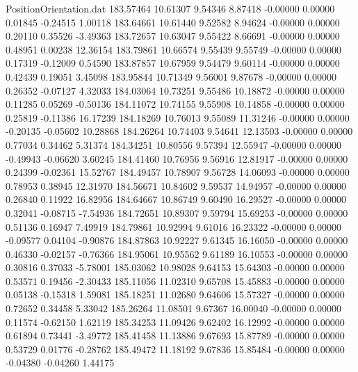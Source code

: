 \begin{filecontents}{PositionOrientation.dat}
 183.57464   10.61307    9.54346     8.87418   -0.00000    0.00000    0.01845   -0.24515    1.00118
 183.64661   10.61440    9.52582     8.94624   -0.00000    0.00000    0.20110    0.35526   -3.49363
 183.72657   10.63047    9.55422     8.66691   -0.00000    0.00000    0.48951    0.00238   12.36154
 183.79861   10.66574    9.55439     9.55749   -0.00000    0.00000    0.17319   -0.12009    0.54590
 183.87857   10.67959    9.54479     9.60114   -0.00000    0.00000    0.42439    0.19051    3.45098
 183.95844   10.71349    9.56001     9.87678   -0.00000    0.00000    0.26352   -0.07127    4.32033
 184.03064   10.73251    9.55486    10.18872   -0.00000    0.00000    0.11285    0.05269   -0.50136
 184.11072   10.74155    9.55908    10.14858   -0.00000    0.00000    0.25819   -0.11386   16.17239
 184.18269   10.76013    9.55089    11.31246   -0.00000    0.00000   -0.20135   -0.05602   10.28868
 184.26264   10.74403    9.54641    12.13503   -0.00000    0.00000    0.77034    0.34462    5.31374
 184.34251   10.80556    9.57394    12.55947   -0.00000    0.00000   -0.49943   -0.06620    3.60245
 184.41460   10.76956    9.56916    12.81917   -0.00000    0.00000    0.24399   -0.02361   15.52767
 184.49457   10.78907    9.56728    14.06093   -0.00000    0.00000    0.78953    0.38945   12.31970
 184.56671   10.84602    9.59537    14.94957   -0.00000    0.00000    0.26840    0.11922   16.82956
 184.64667   10.86749    9.60490    16.29527   -0.00000    0.00000    0.32041   -0.08715   -7.54936
 184.72651   10.89307    9.59794    15.69253   -0.00000    0.00000    0.51136    0.16947    7.49919
 184.79861   10.92994    9.61016    16.23322   -0.00000    0.00000   -0.09577    0.04104   -0.90876
 184.87863   10.92227    9.61345    16.16050   -0.00000    0.00000    0.46330   -0.02157   -0.76366
 184.95061   10.95562    9.61189    16.10553   -0.00000    0.00000    0.30816    0.37033   -5.78001
 185.03062   10.98028    9.64153    15.64303   -0.00000    0.00000    0.53571    0.19456   -2.30433
 185.11056   11.02310    9.65708    15.45883   -0.00000    0.00000    0.05138   -0.15318    1.59081
 185.18251   11.02680    9.64606    15.57327   -0.00000    0.00000    0.72652    0.34458    5.33042
 185.26264   11.08501    9.67367    16.00040   -0.00000    0.00000    0.11574   -0.62150    1.62119
 185.34253   11.09426    9.62402    16.12992   -0.00000    0.00000    0.61894    0.73441   -3.49772
 185.41458   11.13886    9.67693    15.87789   -0.00000    0.00000    0.53729    0.01776   -0.28762
 185.49472   11.18192    9.67836    15.85484   -0.00000    0.00000   -0.04380   -0.04260    1.44175

\end{filecontents}
